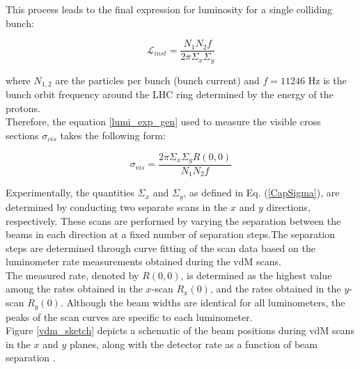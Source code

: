 This process leads to the final expression for luminosity for a single colliding bunch:

\begin{equation}
\mathcal{L}_{inst}=\frac{N_{1} N_{2}f}{2 \pi \Sigma_{x}\Sigma_{y}}
\end{equation}

where $N_{1,2}$ are the particles per bunch (bunch current) and  $f= 11246$ Hz is the bunch orbit frequency around the LHC ring determined by the energy of the protons.\\

Therefore, the equation \ref{lumi_exp_gen} used to measure the visible cross sections $\sigma_{vis}$ takes the following form:

\begin{equation}
  \sigma_{vis}=\frac{2\pi \Sigma_{x} \Sigma_{y} R(0, 0)}{N_{1}N_{2} f}
  \label{sigmavis_eq}
\end{equation}

Experimentally, the quantities $\Sigma_{x}$ and $\Sigma_{y}$, as defined in Eq. (\ref{CapSigma}), are determined by conducting two separate scans in the $x$ and $y$ directions, respectively. 
These scans are performed by varying the separation between the beams in each direction  at a fixed number of separation steps.The separation steps are determined through curve fitting of the scan data based on the luminometer rate measurements obtained during the vdM scans.\\

The measured rate, denoted by $R(0,0)$, is determined as the highest value among the rates obtained in the $x$-scan $R_x(0)$, and the rates obtained in the $y$-scan $R_y(0)$. Although the beam widths are identical for all luminometers, the peaks of the scan curves are specific to each luminometer.\\

Figure \ref{vdm_sketch} depicts a schematic of the beam positions during vdM scans in the $x$ and $y$ planes, along with the detector rate as a function of beam separation  \cite{pas_18}.


